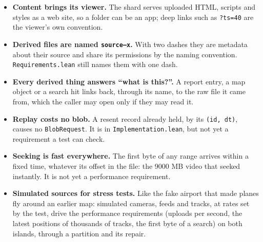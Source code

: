 \begin{itemize}
\item \textbf{Content brings its viewer.} The shard serves uploaded HTML, scripts
  and styles as a web site, so a folder can be an app; deep links such as
  \texttt{?ts=40} are the viewer's own convention.
\item \textbf{Derived files are named \texttt{source--x}.} With two dashes they are
  metadata about their source and share its permissions by the naming convention.
  \texttt{Requirements.lean} still names them with one dash.
\item \textbf{Every derived thing answers ``what is this?''.} A report entry, a
  map object or a search hit links back, through its name, to the raw file it
  came from, which the caller may open only if they may read it.
\item \textbf{Replay costs no blob.} A resent record already held, by its
  \texttt{(id, dt)}, causes no \texttt{BlobRequest}. It is in
  \texttt{Implementation.lean}, but not yet a requirement a test can check.
\item \textbf{Seeking is fast everywhere.} The first byte of any range arrives
  within a fixed time, whatever its offset in the file: the 9000 MB video that
  seeked instantly. It is not yet a performance requirement.
\item \textbf{Simulated sources for stress tests.} Like the fake airport that made
  planes fly around an earlier map: simulated cameras, feeds and tracks, at
  rates set by the test, drive the performance requirements (uploads per second,
  the latest positions of thousands of tracks, the first byte of a search) on both
  islands, through a partition and its repair.
\end{itemize}

